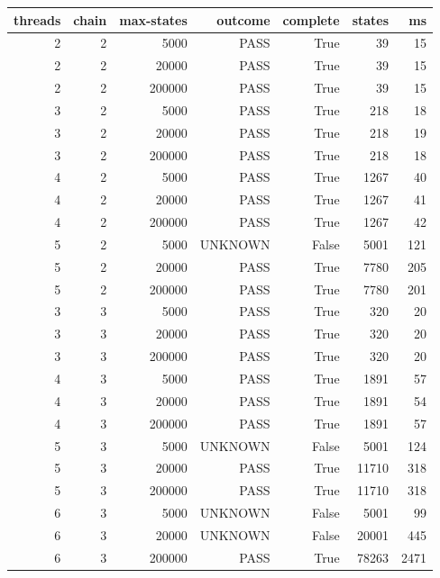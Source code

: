 \begin{tabular}{rrrrrrr}
\toprule
\textbf{threads} & \textbf{chain} & \textbf{max-states} & \textbf{outcome} & \textbf{complete} & \textbf{states} & \textbf{ms} \\
\midrule
2 & 2 & 5000 & PASS & True & 39 & 15 \\
2 & 2 & 20000 & PASS & True & 39 & 15 \\
2 & 2 & 200000 & PASS & True & 39 & 15 \\
3 & 2 & 5000 & PASS & True & 218 & 18 \\
3 & 2 & 20000 & PASS & True & 218 & 19 \\
3 & 2 & 200000 & PASS & True & 218 & 18 \\
4 & 2 & 5000 & PASS & True & 1267 & 40 \\
4 & 2 & 20000 & PASS & True & 1267 & 41 \\
4 & 2 & 200000 & PASS & True & 1267 & 42 \\
5 & 2 & 5000 & UNKNOWN & False & 5001 & 121 \\
5 & 2 & 20000 & PASS & True & 7780 & 205 \\
5 & 2 & 200000 & PASS & True & 7780 & 201 \\
3 & 3 & 5000 & PASS & True & 320 & 20 \\
3 & 3 & 20000 & PASS & True & 320 & 20 \\
3 & 3 & 200000 & PASS & True & 320 & 20 \\
4 & 3 & 5000 & PASS & True & 1891 & 57 \\
4 & 3 & 20000 & PASS & True & 1891 & 54 \\
4 & 3 & 200000 & PASS & True & 1891 & 57 \\
5 & 3 & 5000 & UNKNOWN & False & 5001 & 124 \\
5 & 3 & 20000 & PASS & True & 11710 & 318 \\
5 & 3 & 200000 & PASS & True & 11710 & 318 \\
6 & 3 & 5000 & UNKNOWN & False & 5001 & 99 \\
6 & 3 & 20000 & UNKNOWN & False & 20001 & 445 \\
6 & 3 & 200000 & PASS & True & 78263 & 2471 \\
\bottomrule
\end{tabular}
